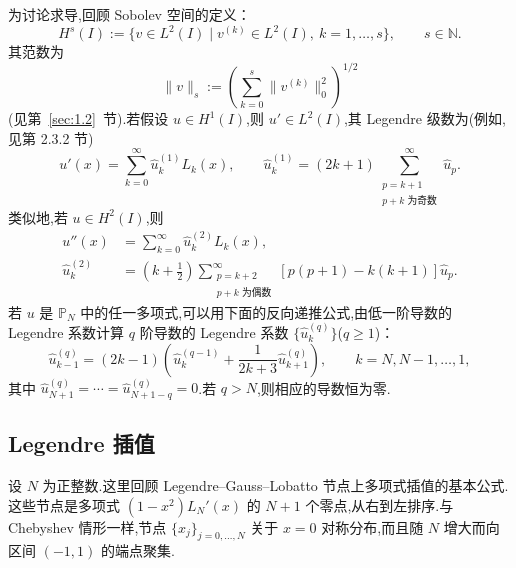 为讨论求导,回顾 Sobolev 空间的定义：
\begin{equation}\label{eq:4.4.8}
  H^s(I):=\{v\in L^2(I)\mid v^{(k)}\in L^2(I),\ k=1,\ldots,s\},
  \qquad s\in\mathbb N.
\end{equation}
其范数为
\begin{equation}\label{eq:4.4.9}
  \|v\|_s:=\left(\sum_{k=0}^s\|v^{(k)}\|_0^2\right)^{1/2}
\end{equation}
(见第~\ref{sec:1.2}~节).若假设 \(u\in H^1(I)\),则 \(u'\in L^2(I)\),其 Legendre 级数为(例如,见第 2.3.2 节)
\begin{equation}\label{eq:4.4.10}
  u'(x)=\sum_{k=0}^\infty\widehat u_k^{(1)}L_k(x),\qquad
  \widehat u_k^{(1)}=(2k+1)\sum_{\substack{p=k+1\\p+k\text{ 为奇数}}}^\infty\widehat u_p.
\end{equation}
类似地,若 \(u\in H^2(I)\),则
\begin{equation}\label{eq:4.4.11}
  \begin{aligned}
    u''(x)&=\sum_{k=0}^\infty\widehat u_k^{(2)}L_k(x),\\
    \widehat u_k^{(2)}&=\left(k+\frac12\right)
      \sum_{\substack{p=k+2\\p+k\text{ 为偶数}}}^\infty
      [p(p+1)-k(k+1)]\widehat u_p.
  \end{aligned}
\end{equation}
若 \(u\) 是 \(\mathbb P_N\) 中的任一多项式,可以用下面的反向递推公式,由低一阶导数的 Legendre 系数计算 \(q\) 阶导数的 Legendre 系数 \(\{\widehat u_k^{(q)}\}\)(\(q\ge1\))：
\begin{equation}\label{eq:4.4.12}
  \widehat u_{k-1}^{(q)}=(2k-1)
     \left(\widehat u_k^{(q-1)}+\frac1{2k+3}\widehat u_{k+1}^{(q)}\right),
  \qquad k=N,N-1,\ldots,1,
\end{equation}
其中 \(\widehat u_{N+1}^{(q)}=\cdots=\widehat u_{N+1-q}^{(q)}=0\).若 \(q>N\),则相应的导数恒为零.

\subsection{Legendre 插值}\label{sec:4.4.2}

设 \(N\) 为正整数.这里回顾 Legendre--Gauss--Lobatto 节点上多项式插值的基本公式.这些节点是多项式 \((1-x^2)L_N'(x)\) 的 \(N+1\) 个零点,从右到左排序.与 Chebyshev 情形一样,节点 \(\{x_j\}_{j=0,\ldots,N}\) 关于 \(x=0\) 对称分布,而且随 \(N\) 增大而向区间 \((-1,1)\) 的端点聚集.

